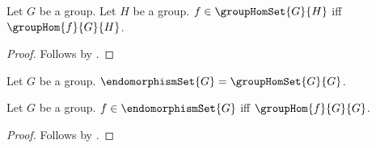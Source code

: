 \begin{proposition}\label{group_hom_set_iff}
    Let $G$ be a group.
    Let $H$ be a group.
    $f\in\groupHomSet{G}{H}$ iff $\groupHom{f}{G}{H}$.
\end{proposition}
\begin{proof}
    Follows by .
\end{proof}

\begin{definition}\label{endomorphism_set}
    Let $G$ be a group.
    $\endomorphismSet{G}=\groupHomSet{G}{G}$.
\end{definition}

\begin{proposition}\label{endomorphism_set_iff}
    Let $G$ be a group.
    $f\in\endomorphismSet{G}$ iff $\groupHom{f}{G}{G}$.
\end{proposition}
\begin{proof}
    Follows by .
\end{proof}
